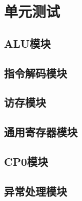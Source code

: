 \section{单元测试}
\subsection{ALU模块}
\subsection{指令解码模块}
\subsection{访存模块}
\subsection{通用寄存器模块}
\subsection{CP0模块}
\subsection{异常处理模块}